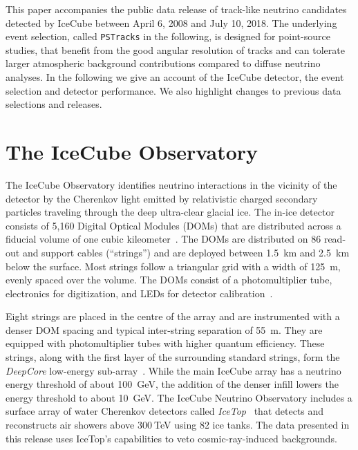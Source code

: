 \documentclass[aps,10pt,prd,twocolumn,floats,letterpaper,showpacs,nofootinbib,bibnotes,notitlepage,superscriptaddress,floatfix]{revtex4-1}
\newcommand{\MA}[1]{{\color{magenta}#1}}
\begin{document}
This paper accompanies the public data release of track-like neutrino candidates detected by IceCube between April 6, 2008 and July 10, 2018. The underlying event selection, \MA{called {\tt PSTracks} in the following}, is designed for point-source studies, that benefit from the good angular resolution of tracks and can tolerate larger atmospheric background contributions compared to diffuse neutrino analyses. In the following we give an account of the IceCube detector, the event selection and detector performance. We also highlight changes to previous data selections and releases.

\section{The IceCube Observatory}

The IceCube Observatory identifies neutrino interactions in the vicinity of the detector by the Cherenkov light emitted by relativistic charged secondary particles traveling through the deep ultra-clear glacial ice. The in-ice detector consists of 5,160 Digital Optical Modules (DOMs) that are distributed across a fiducial volume of one cubic kileometer~\cite{Abbasi:2008aa, Abbasi:2010vc}. The DOMs are distributed on 86 read-out and support cables (``strings'') and are deployed between 1.5~km and 2.5~km below the surface. Most strings follow a triangular grid with a width of 125~m, evenly spaced over the volume. The DOMs consist of a photomultiplier tube, electronics for digitization, and LEDs for detector calibration~\cite{Abbasi:2008aa, Abbasi:2010vc}.

Eight strings are placed in the centre of the array and are instrumented with a denser DOM spacing and typical inter-string separation of 55~m. They are equipped with photomultiplier tubes with higher quantum efficiency. These strings, along with the first layer of the surrounding standard strings, form the \emph{DeepCore} low-energy sub-array~\cite{Collaboration:2011ym}. While the main IceCube array has a neutrino energy threshold of about 100~GeV, the addition of the denser infill lowers the energy threshold to about 10~GeV. The IceCube Neutrino Observatory includes a surface array of water Cherenkov detectors called \emph{IceTop}~\cite{IceCube:2012nn} that detects and reconstructs air showers above $300\:$TeV using 82 ice tanks. The data presented in this release uses IceTop's capabilities to veto cosmic-ray-induced backgrounds.
\end{document}
